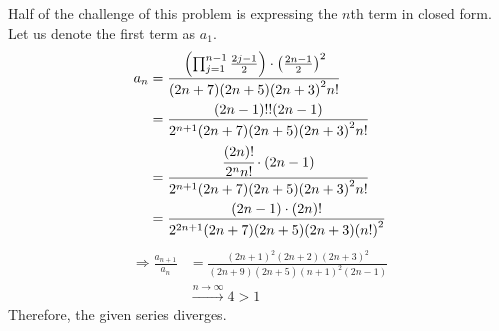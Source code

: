 \item

Half of the challenge of this problem is expressing the $n$th term in closed form.
Let us denote the first term as $a_1$.
\begin{align*}
	a_n
	&= \cfrac{
		\left( \prod_{j = 1}^{n - 1} \frac{2j - 1}{2} \right) \cdot {\left( \frac{2n - 1}{2} \right)}^2
	}{
		(2n + 7) (2n + 5) {(2n + 3)}^2 n!
	} \\
	&= \frac{(2n - 1)!! (2n - 1)}{2^{n + 1} (2n + 7) (2n + 5) {(2n + 3)}^2 n!} \\
	&= \cfrac{\cfrac{(2n)!}{2^n n!} \cdot (2n - 1)}{2^{n + 1} (2n + 7) (2n + 5) {(2n + 3)}^2 n!} \\
	&= \frac{(2n - 1) \cdot (2n)!}{2^{2n + 1} (2n + 7) (2n + 5) (2n + 3) {(n!)}^2}
\end{align*}
\begin{align*}
	\Rightarrow \frac{a_{n + 1}}{a_n}
	&= \frac{{(2n + 1)}^2 (2n + 2) {(2n + 3)}^2}{(2n + 9) (2n + 5) {(n + 1)}^2 (2n - 1)} \\
	&\xrightarrow{n \rightarrow \infty} 4 > 1
\end{align*}
Therefore, the given series diverges.
